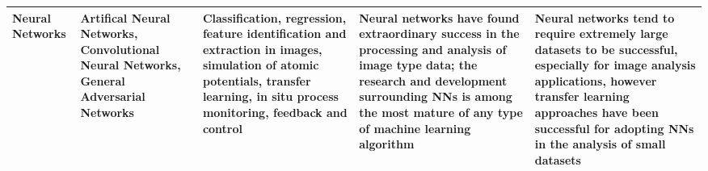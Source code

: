 \begin{table*}
\begin{tabular}{|p{2.25cm}|p{2.25cm}|p{3cm}|p{4cm}|p{4cm}|}
Neural Networks & \raggedright Artifical Neural Networks, Convolutional Neural Networks, General Adversarial Networks & Classification, regression, feature identification and extraction in images, simulation of atomic potentials, transfer learning, in situ process monitoring, feedback and control & Neural networks have found extraordinary success in the processing and analysis of image type data; the research and development surrounding NNs is among the most mature of any type of machine learning algorithm & Neural networks tend to require extremely large datasets to be successful, especially for image analysis applications, however transfer learning approaches have been successful for adopting NNs in the analysis of small datasets \\ \hline

\end{tabular}
\end{table*}









